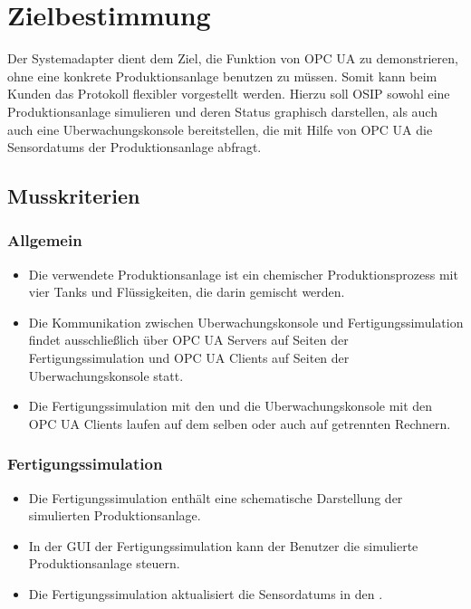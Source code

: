 \documentclass[parskip=full]{scrartcl}
\begin{document}
\pagebreak
\section{Zielbestimmung}
Der \gls{Systemadapter} dient dem Ziel, die Funktion von \gls{OPC UA} zu demonstrieren, ohne eine konkrete \gls{Produktionsanlage}
benutzen zu müssen. Somit kann beim Kunden das Protokoll flexibler vorgestellt werden. Hierzu soll OSIP
sowohl eine \gls{Produktionsanlage} simulieren und deren Status graphisch darstellen, als auch auch eine \gls{Uberwachungskonsole}
bereitstellen, die mit Hilfe von \gls{OPC UA} die \glspl{Sensordatum} der \gls{Produktionsanlage} abfragt.\\

\subsection{Musskriterien}
\subsubsection{Allgemein}
\begin{itemize}
  \item Die verwendete \gls{Produktionsanlage} ist ein chemischer Produktionsprozess mit vier Tanks und Flüssigkeiten, die darin gemischt werden.
  \item Die Kommunikation zwischen \gls{Uberwachungskonsole} und \gls{Fertigungssimulation} findet ausschließlich \"uber
  \glspl{OPC UA Server} auf Seiten der \gls{Fertigungssimulation} und \glspl{OPC UA Client} auf Seiten der \gls{Uberwachungskonsole} statt.
  \item Die \gls{Fertigungssimulation} mit den  und die \gls{Uberwachungskonsole} mit den \glspl{OPC UA Client} laufen auf dem selben oder auch auf getrennten Rechnern.
\end{itemize}

\subsubsection{Fertigungssimulation}
\begin{itemize}
  \item Die \gls{Fertigungssimulation} enth\"alt eine schematische Darstellung der simulierten \gls{Produktionsanlage}.
  \item In der \gls{GUI} der \gls{Fertigungssimulation} kann der Benutzer die simulierte \gls{Produktionsanlage} steuern.
  \item Die \gls{Fertigungssimulation} aktualisiert die \glspl{Sensordatum} in den .
\end{itemize}
\end{document}
